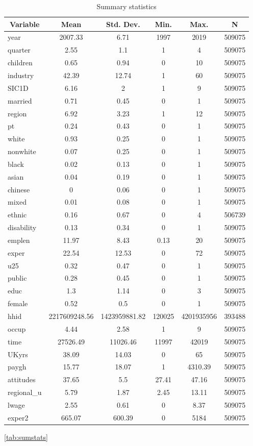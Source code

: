 
\begin{table}[htbp]\centering \caption{Summary statistics \label{sumstats}}
\begin{tabular}{l c c c c c}\hline\hline
\multicolumn{1}{c}{\textbf{Variable}} & \textbf{Mean}
 & \textbf{Std. Dev.}& \textbf{Min.} &  \textbf{Max.} & \textbf{N}\\ \hline
year & 2007.33 & 6.71 & 1997 & 2019 & 509075\\
quarter & 2.55 & 1.1 & 1 & 4 & 509075\\
children & 0.65 & 0.94 & 0 & 10 & 509075\\
industry & 42.39 & 12.74 & 1 & 60 & 509075\\
SIC1D & 6.16 & 2 & 1 & 9 & 509075\\
married & 0.71 & 0.45 & 0 & 1 & 509075\\
region & 6.92 & 3.23 & 1 & 12 & 509075\\
pt & 0.24 & 0.43 & 0 & 1 & 509075\\
white & 0.93 & 0.25 & 0 & 1 & 509075\\
nonwhite & 0.07 & 0.25 & 0 & 1 & 509075\\
black & 0.02 & 0.13 & 0 & 1 & 509075\\
asian & 0.04 & 0.19 & 0 & 1 & 509075\\
chinese & 0 & 0.06 & 0 & 1 & 509075\\
mixed & 0.01 & 0.08 & 0 & 1 & 509075\\
ethnic & 0.16 & 0.67 & 0 & 4 & 506739\\
disability & 0.13 & 0.34 & 0 & 1 & 509075\\
emplen & 11.97 & 8.43 & 0.13 & 20 & 509075\\
exper & 22.54 & 12.53 & 0 & 72 & 509075\\
u25 & 0.32 & 0.47 & 0 & 1 & 509075\\
public & 0.28 & 0.45 & 0 & 1 & 509075\\
educ & 1.3 & 1.14 & 0 & 3 & 509075\\
female & 0.52 & 0.5 & 0 & 1 & 509075\\
hhid & 2217609248.56 & 1423959881.82 & 120025 & 4201935956 & 393488\\
occup & 4.44 & 2.58 & 1 & 9 & 509075\\
time & 27526.49 & 11026.46 & 11997 & 42019 & 509075\\
UKyrs & 38.09 & 14.03 & 0 & 65 & 509075\\
paygh & 15.77 & 18.07 & 1 & 4310.39 & 509075\\
attitudes & 37.65 & 5.5 & 27.41 & 47.16 & 509075\\
regional\_u & 5.79 & 1.87 & 2.45 & 13.11 & 509075\\
lwage & 2.55 & 0.61 & 0 & 8.37 & 509075\\
exper2 & 665.07 & 600.39 & 0 & 5184 & 509075\\
\hline\end{tabular}
\ref{tab:sumstats}
\end{table}
